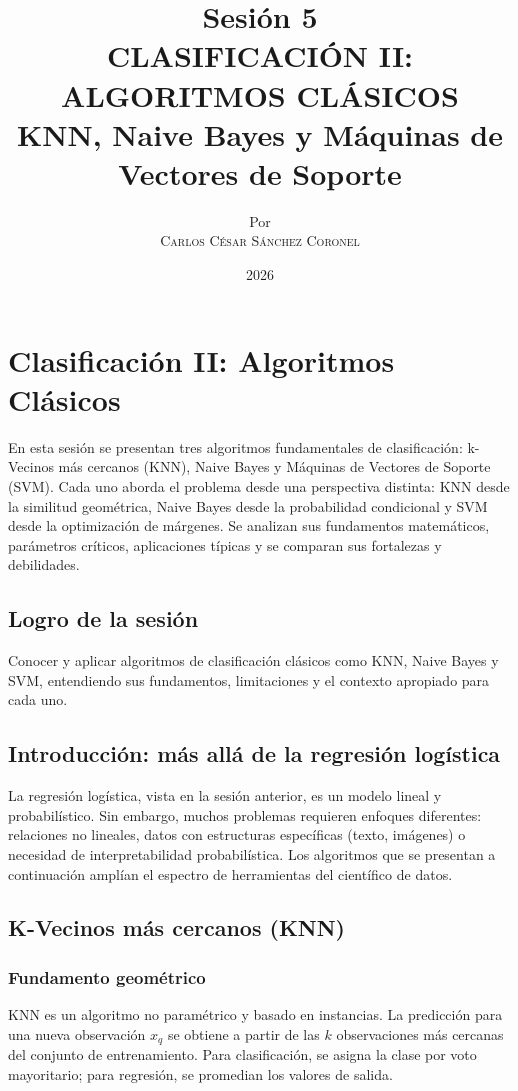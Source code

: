 \documentclass[12pt,a4paper,openany,oneside]{book}
\title{
    \textbf{Sesión 5} \\ 
    \Huge \textbf{CLASIFICACIÓN II: ALGORITMOS CLÁSICOS} \\
    \Large KNN, Naive Bayes y Máquinas de Vectores de Soporte
}
\author{
    \small Por \\ \vspace{0.2cm}
    \Large \textsc{Carlos César Sánchez Coronel}
}
\date{2026}
\begin{document}
\maketitle
\tableofcontents
{}

\chapter{Clasificación II: Algoritmos Clásicos}

En esta sesión se presentan tres algoritmos fundamentales de clasificación: k-Vecinos más cercanos (KNN), Naive Bayes y Máquinas de Vectores de Soporte (SVM). Cada uno aborda el problema desde una perspectiva distinta: KNN desde la similitud geométrica, Naive Bayes desde la probabilidad condicional y SVM desde la optimización de márgenes. Se analizan sus fundamentos matemáticos, parámetros críticos, aplicaciones típicas y se comparan sus fortalezas y debilidades.

\section{Logro de la sesión}
Conocer y aplicar algoritmos de clasificación clásicos como KNN, Naive Bayes y SVM, entendiendo sus fundamentos, limitaciones y el contexto apropiado para cada uno.

\section{Introducción: más allá de la regresión logística}
La regresión logística, vista en la sesión anterior, es un modelo lineal y probabilístico. Sin embargo, muchos problemas requieren enfoques diferentes: relaciones no lineales, datos con estructuras específicas (texto, imágenes) o necesidad de interpretabilidad probabilística. Los algoritmos que se presentan a continuación amplían el espectro de herramientas del científico de datos.

\section{K-Vecinos más cercanos (KNN)}

\subsection{Fundamento geométrico}
KNN es un algoritmo no paramétrico y basado en instancias. La predicción para una nueva observación \(x_q\) se obtiene a partir de las \(k\) observaciones más cercanas del conjunto de entrenamiento. Para clasificación, se asigna la clase por voto mayoritario; para regresión, se promedian los valores de salida.
\end{document}
